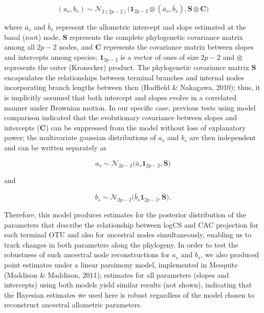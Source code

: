 \documentclass[12pt,twoside]{report}
\begin{document}
\begin{equation}
(a_{s}, b_{s}) \sim \mathcal{N}_{2(2p - 2)} \Big(\mathbf{1}_{2p - 2} \otimes (\bar{a}_s, \bar{b}_s), \mathbf{S} \otimes \mathbf{C} \Big)
\end{equation}

where $\bar{a}_s$ and $\bar{b}_s$ represent the allometric intercept and
slope estimated at the basal (root) node, $\mathbf{S}$ represents the
complete phylogenetic covariance matrix among all $2p - 2$ nodes, and
$\mathbf{C}$ represents the covariance matrix between slopes and
intercepts among species; $\mathbf{1}_{2p - 2}$ is a vector of ones of
size $2p - 2$ and $\otimes$ represents the outer (Kronecker) product.
The phylogenetic covariance matrix $\mathbf{S}$ encapsulates the
relationships between terminal branches and internal nodes incorporating
branch lengths between then (Hadfield \& Nakagawa, 2010); thus, it is
implicitly assumed that both intercept and slopes evolve in a correlated
manner under Brownian motion. In our specific case, previous tests using
model comparison indicated that the evolutionary covariance between
slopes and intercepts ($\mathbf{C}$) can be suppressed from the model
without loss of explanatory power; the multivariate gaussian
distributions of $a_s$ and $b_s$ are then independent and can be written
separately as

\begin{equation}
a_{s} \sim \mathcal{N}_{2p - 2} \Big(\bar{a}_s\mathbf{1}_{2p - 2}, \mathbf{S}\Big)
\end{equation}

and

\begin{equation}
b_{s} \sim \mathcal{N}_{2p - 2} \Big(\bar{b}_s\mathbf{1}_{2p - 2}, \mathbf{S}\Big).
\end{equation}

Therefore, this model produces estimates for the posterior distribution
of the parameters that describe the relationship between logCS and CAC
projection for each terminal OTU and also for ancestral nodes
simultaneously, enabling us to track changes in both parameters along
the phylogeny. In order to test the robustness of such ancestral node
reconstructions for $a_s$ and $b_s$, we also produced point estimates
under a linear parsimony model, implemented in Mesquite (Maddison \&
Maddison, 2011); estimates for all parameters (slopes and intercepts)
using both models yield similar results (not shown), indicating that the
Bayesian estimates we used here is robust regardless of the model chosen
to reconstruct ancestral allometric parameters.
\end{document}
